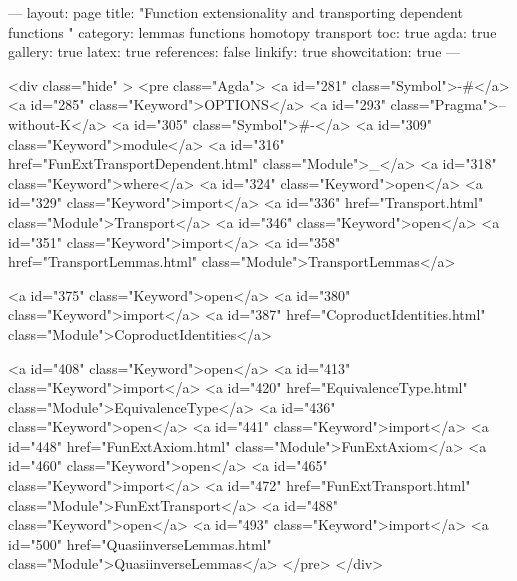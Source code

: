 ---
layout: page
title: "Function extensionality and transporting dependent functions "
category: lemmas functions homotopy transport
toc: true
agda: true
gallery: true
latex: true
references: false
linkify: true
showcitation: true
---

<div class="hide" >
<pre class="Agda">
<a id="281" class="Symbol">{-#</a> <a id="285" class="Keyword">OPTIONS</a> <a id="293" class="Pragma">--without-K</a> <a id="305" class="Symbol">#-}</a>
<a id="309" class="Keyword">module</a> <a id="316" href="FunExtTransportDependent.html" class="Module">_</a> <a id="318" class="Keyword">where</a>
<a id="324" class="Keyword">open</a> <a id="329" class="Keyword">import</a> <a id="336" href="Transport.html" class="Module">Transport</a>
<a id="346" class="Keyword">open</a> <a id="351" class="Keyword">import</a> <a id="358" href="TransportLemmas.html" class="Module">TransportLemmas</a>

<a id="375" class="Keyword">open</a> <a id="380" class="Keyword">import</a> <a id="387" href="CoproductIdentities.html" class="Module">CoproductIdentities</a>

<a id="408" class="Keyword">open</a> <a id="413" class="Keyword">import</a> <a id="420" href="EquivalenceType.html" class="Module">EquivalenceType</a>
<a id="436" class="Keyword">open</a> <a id="441" class="Keyword">import</a> <a id="448" href="FunExtAxiom.html" class="Module">FunExtAxiom</a>
<a id="460" class="Keyword">open</a> <a id="465" class="Keyword">import</a> <a id="472" href="FunExtTransport.html" class="Module">FunExtTransport</a>
<a id="488" class="Keyword">open</a> <a id="493" class="Keyword">import</a> <a id="500" href="QuasiinverseLemmas.html" class="Module">QuasiinverseLemmas</a>
</pre>
</div>

